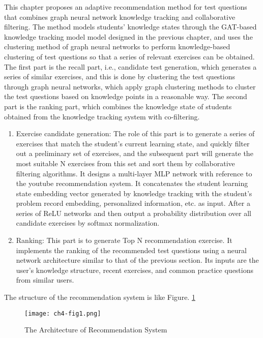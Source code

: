 This chapter proposes an adaptive recommendation method for test questions that combines graph neural network knowledge tracking and collaborative filtering. The method models students' knowledge states through the GAT-based knowledge tracking model model designed in the previous chapter, and uses the clustering method of graph neural networks to perform knowledge-based clustering of test questions so that a series of relevant exercises can be obtained. The first part is the recall part, i.e., candidate test generation, which generates a series of similar exercises, and this is done by clustering the test questions through graph neural networks, which apply graph clustering methods to cluster the test questions based on knowledge points in a reasonable way. The second part is the ranking part, which combines the knowledge state of students obtained from the knowledge tracking system with co-filtering.
\begin{enumerate}
  \item Exercise candidate generation: The role of this part is to generate a series of exercises that match the student's current learning state, and quickly filter out a preliminary set of exercises, and the subsequent part will generate the most suitable N exercises from this set and sort them by collaborative filtering algorithms. It designs a multi-layer MLP network with reference to the youtube recommendation system. It concatenates the student learning state embedding vector generated by knowledge tracking with the student's problem record embedding, personalized information, etc. as input. After a series of ReLU networks and then output a probability distribution over all candidate exercises by softmax normalization.
  \item Ranking: This part is to generate Top N recommendation exercise. It implements the ranking of the recommended test questions using a neural network architecture similar to that of the previous section. Its inputs are the user's knowledge structure, recent exercises, and common practice questions from similar users.
\end{enumerate}

The structure of the recommendation system is like Figure. \ref{fig0}

\begin{figure}[h]
  \centering
  \texttt{[image: ch4-fig1.png]}
  \caption{The Architecture of Recommendation System}
  \label{fig0}
\end{figure}

